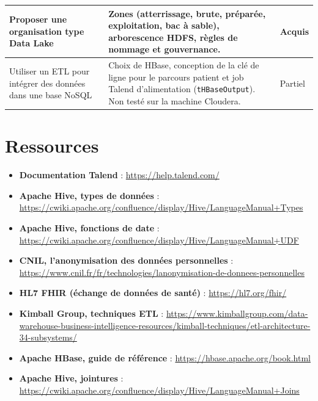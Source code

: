 \begin{center}
\begin{tabular}{|>{\raggedright\arraybackslash}p{}|>{\raggedright\arraybackslash}p{}|m{}|}
Proposer une organisation type Data Lake &
Zones (atterrissage, brute, préparée, exploitation, bac à sable), arborescence HDFS, règles de nommage et gouvernance. &
{\color{green!60!black}Acquis} \\ \hline

Utiliser un ETL pour intégrer des données dans une base NoSQL &
Choix de HBase, conception de la clé de ligne pour le parcours patient et job Talend d'alimentation (\texttt{tHBaseOutput}). Non testé sur la machine Cloudera. &
{\color{orange}Partiel} \\ \hline

\end{tabular}
\end{center}

\newpage
\section*{Ressources}
{}

\begin{itemize}
	\item \textbf{Documentation Talend} : \url{https://help.talend.com/}
	\item \textbf{Apache Hive, types de données} : \url{https://cwiki.apache.org/confluence/display/Hive/LanguageManual+Types}
	\item \textbf{Apache Hive, fonctions de date} : \url{https://cwiki.apache.org/confluence/display/Hive/LanguageManual+UDF}
	\item \textbf{CNIL, l'anonymisation des données personnelles} : \url{https://www.cnil.fr/fr/technologies/lanonymisation-de-donnees-personnelles}
	\item \textbf{HL7 FHIR (échange de données de santé)} : \url{https://hl7.org/fhir/}
	\item \textbf{Kimball Group, techniques ETL} : \url{https://www.kimballgroup.com/data-warehouse-business-intelligence-resources/kimball-techniques/etl-architecture-34-subsystems/}
	\item \textbf{Apache HBase, guide de référence} : \url{https://hbase.apache.org/book.html}
	\item \textbf{Apache Hive, jointures} : \url{https://cwiki.apache.org/confluence/display/Hive/LanguageManual+Joins}
\end{itemize}
